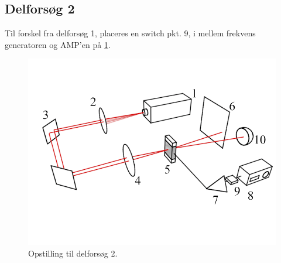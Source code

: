 \documentclass[main]{subfiles}
\begin{document}
\subsection{Delforsøg 2}
Til forskel fra delforsøg 1, placeres en switch pkt. 9, i mellem frekvens generatoren og AMP'en på \cref{fig:opstilling2}.
\begin{figure}[H]
    \includegraphics[width=\linewidth]{tegninger/tegning2.png}
    \caption{Opstilling til delforsøg 2.}
    \label{fig:opstilling2}
\end{figure}
\end{document}
